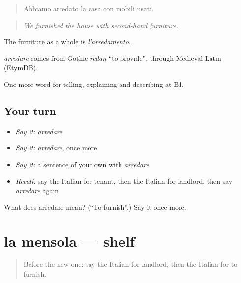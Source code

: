 \begin{quote}
Abbiamo arredato la casa con mobili usati.
\end{quote}

\begin{quote}
\emph{We furnished the house with second-hand furniture.}
\end{quote}

The furniture as a whole is \emph{l'arredamento}.

\begin{cousinweb}
\emph{arredare} comes from Gothic \emph{rēdan} \textquotedblleft{}to provide\textquotedblright{}, through Medieval Latin (EtymDB).
\end{cousinweb}

\begin{grammarlens}[title={What you've built}]
One more word for telling, explaining and describing at B1.
\end{grammarlens}

\subsection*{Your turn}
\begin{itemize}
\raggedright
  \item \emph{Say it:} \emph{arredare}
  \item \emph{Say it:} \emph{arredare}, once more
  \item \emph{Say it:} a sentence of your own with \emph{arredare}
  \item \emph{Recall:} say the Italian for tenant, then the Italian for landlord, then say \emph{arredare} again
\end{itemize}

\begin{tcolorbox}[breakable,colback=teal!4,colframe=teal!35!black,title={Before you move on}]
What does arredare mean? (\textquotedblleft{}To furnish\textquotedblright{}.) Say it once more.
\end{tcolorbox}
\section[la mensola]{la mensola — shelf}

\label{lesson:IT-C536-mensola}



\begin{quote}
Before the new one: say the Italian for landlord, then the Italian for to furnish.
\end{quote}


